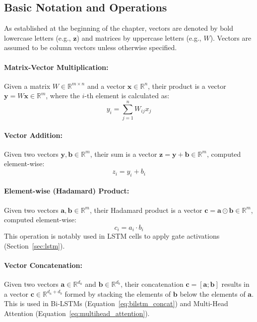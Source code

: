 \begin{appendices}
  \subsection{Basic Notation and Operations}

  As established at the beginning of the chapter, vectors are denoted by bold lowercase letters (e.g., \( \bm{z} \)) and matrices by uppercase letters (e.g., \( W \)). Vectors are assumed to be column vectors unless otherwise specified.

  \paragraph{Matrix-Vector Multiplication:}
  Given a matrix \( W \in \mathbb{R}^{m \times n} \) and a vector \( \bm{x} \in \mathbb{R}^n \), their product is a vector \( \bm{y} = W\bm{x} \in \mathbb{R}^m \), where the \( i \)-th element is calculated as:
  \begin{equation}
    y_i = \sum_{j=1}^{n} W_{ij} x_j
  \end{equation}

  \paragraph{Vector Addition:}
  Given two vectors \( \bm{y}, \bm{b} \in \mathbb{R}^m \), their sum is a vector \( \bm{z} = \bm{y} + \bm{b} \in \mathbb{R}^m \), computed element-wise:
  \begin{equation}
    z_i = y_i + b_i
  \end{equation}

  \paragraph{Element-wise (Hadamard) Product:}
  Given two vectors \( \bm{a}, \bm{b} \in \mathbb{R}^m \), their Hadamard product is a vector \( \bm{c} = \bm{a} \odot \bm{b} \in \mathbb{R}^m \), computed element-wise:
  \begin{equation}
    c_i = a_i \cdot b_i
  \end{equation}
  This operation is notably used in LSTM cells to apply gate activations (Section~\ref{sec:lstm}).

  \paragraph{Vector Concatenation:}
  Given two vectors \( \bm{a} \in \mathbb{R}^{d_a} \) and \( \bm{b} \in \mathbb{R}^{d_b} \), their concatenation \( \bm{c} = [\bm{a} ; \bm{b}] \) results in a vector \( \bm{c} \in \mathbb{R}^{d_a + d_b} \) formed by stacking the elements of \( \bm{b} \) below the elements of \( \bm{a} \). This is used in Bi-LSTMs (Equation~\ref{eq:bilstm_concat}) and Multi-Head Attention (Equation~\ref{eq:multihead_attention}).


\end{appendices}
